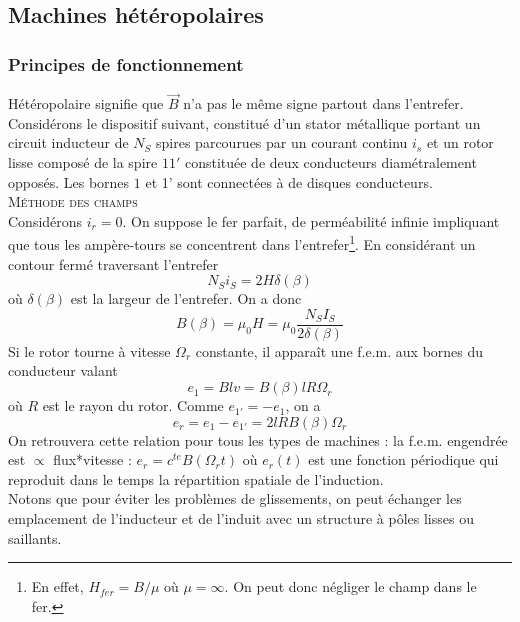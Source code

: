 	
	\subsection{Machines hétéropolaires}
		\subsubsection{Principes de fonctionnement}
		Hétéropolaire signifie que $\vec{B}$ n'a pas le même signe 
		partout dans l'entrefer. Considérons le dispositif suivant, 
		constitué d'un stator métallique portant un circuit inducteur 
		de $N_S$ spires parcourues par un courant continu $i_s$ et 
		un rotor lisse composé de la spire $11'$ constituée de deux 
		conducteurs diamétralement opposés. Les bornes $1$ et 1' sont 
		connectées à de disques conducteurs.\\
		
		\textsc{Méthode des champs}\\
		Considérons $i_r=0$. On suppose le fer parfait, de perméabilité 
		infinie impliquant que tous les ampère-tours se concentrent dans 
		l'entrefer\footnote{En effet, $H_{fer} = B/\mu$ où $\mu = \infty$. 
		On peut donc négliger le champ dans le fer.}. En considérant un 
		contour fermé traversant l'entrefer 
		\begin{equation}
		N_Si_S = 2H\delta(\beta)
		\end{equation}
		où $\delta(\beta)$ est la largeur de l'entrefer. On a donc
		\begin{equation}
		B(\beta) = \mu_0H = \mu_0\frac{N_SI_S}{2\delta(\beta)}
		\end{equation}
		Si le rotor tourne à vitesse $\Omega_r$ constante, il apparaît une 
		f.e.m. aux bornes du conducteur valant
		\begin{equation}
		e_1 = Blv = B(\beta)lR\Omega_r
		\end{equation}
		où $R$ est le rayon du rotor. Comme $e_{1'} = -e_1$, on a 
		\begin{equation}
		e_r = e_1-e_{1'} = 2lRB(\beta)\Omega_r
		\end{equation}
		On retrouvera cette relation pour tous les types de machines : la 
		f.e.m. engendrée est $\propto$ flux*vitesse : $e_r = c^{te}B(
		\Omega_rt)$ où $e_r(t)$ est une fonction périodique qui reproduit 
		dans le temps la répartition spatiale de l'induction. \\
		Notons que pour éviter les problèmes de glissements, on peut 
		échanger les emplacement de l'inducteur et de l'induit avec un 
		structure à pôles lisses ou saillants.\\
		
